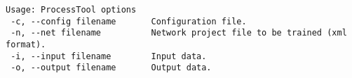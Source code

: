 \begin{verbatim}
Usage: ProcessTool options
 -c, --config filename       Configuration file.
 -n, --net filename          Network project file to be trained (xml format).
 -i, --input filename        Input data.
 -o, --output filename       Output data.
\end{verbatim}
